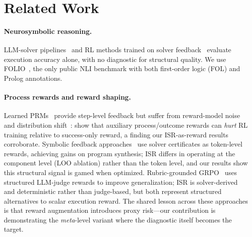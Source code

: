 \section{Related Work}
\label{sec:related-work}

\paragraph{Neurosymbolic reasoning.}
LLM-solver pipelines~\citep{satlm, logic-lm, linc, fover-pei2025, lorp} and RL methods trained on solver feedback~\citep{mellgren-prolog-grpo, logic-rl, deepseek-prover-v15} evaluate execution accuracy alone, with no diagnostic for structural quality.
We use FOLIO~\citep{folio}, the only public NLI benchmark with both first-order logic (FOL) and Prolog annotations.

\paragraph{Process rewards and reward shaping.}
Learned PRMs~\citep{lightman-verify-step, math-shepherd} provide step-level feedback but suffer from reward-model noise and distribution shift~\citep{processbench}: \citet{gao-effective-rl-reward} show that auxiliary process/outcome rewards can \emph{hurt} RL training relative to success-only reward, a finding our ISR-as-reward results corroborate.
Symbolic feedback approaches~\citep{rlsf} use solver certificates as token-level rewards, achieving gains on program synthesis; ISR differs in operating at the component level (LOO ablation) rather than the token level, and our results show this structural signal is gamed when optimized.
Rubric-grounded GRPO~\citep{rubric-grpo} uses structured LLM-judge rewards to improve generalization; ISR is solver-derived and deterministic rather than judge-based, but both represent structured alternatives to scalar execution reward.
The shared lesson across these approaches is that reward augmentation introduces proxy risk---our contribution is demonstrating the \emph{meta}-level variant where the diagnostic itself becomes the target.

